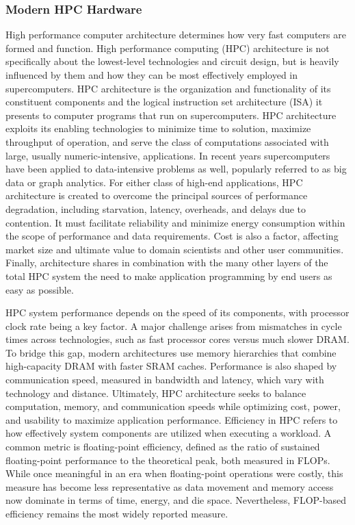 \subsubsection{Modern HPC Hardware}
\label{sec:background_hpc_hardware}
High performance computer architecture determines how very fast computers are formed and function. High performance computing (HPC) architecture is not specifically about the lowest-level technologies and circuit design, but is heavily influenced by them and how they can be most effectively employed in supercomputers. HPC architecture is the organization and functionality of its constituent components and the logical instruction set architecture (ISA) it presents to computer programs that run on supercomputers. HPC architecture exploits its enabling technologies to minimize time to solution, maximize throughput of operation, and serve the class of computations associated with large, usually numeric-intensive, applications. In recent years supercomputers have been applied to data-intensive problems as well, popularly referred to as big data or graph analytics. For either class of high-end applications, HPC architecture is created to overcome the principal sources of performance degradation, including starvation, latency, overheads, and delays due to contention. It must facilitate reliability and minimize energy consumption within the scope of performance and data requirements. Cost is also a factor, affecting market size and ultimate value to domain scientists and other user communities. Finally, architecture shares in combination with the many other layers of the total HPC system the need to make application programming by end users as easy as possible.

HPC system performance depends on the speed of its components, with processor clock rate being a key factor. A major challenge arises from mismatches in cycle times across technologies, such as fast processor cores versus much slower DRAM. To bridge this gap, modern architectures use memory hierarchies that combine high-capacity DRAM with faster SRAM caches. Performance is also shaped by communication speed, measured in bandwidth and latency, which vary with technology and distance. Ultimately, HPC architecture seeks to balance computation, memory, and communication speeds while optimizing cost, power, and usability to maximize application performance.
Efficiency in HPC refers to how effectively system components are utilized when executing a workload. A common metric is floating-point efficiency, defined as the ratio of sustained floating-point performance to the theoretical peak, both measured in FLOPs. While once meaningful in an era when floating-point operations were costly, this measure has become less representative as data movement and memory access now dominate in terms of time, energy, and die space. Nevertheless, FLOP-based efficiency remains the most widely reported measure.

